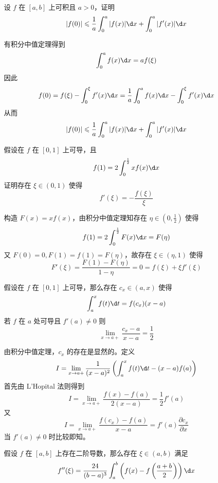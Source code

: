 \begin{problem}[000046]
设 $f$ 在 $[a, b]$ 上可积且 $a > 0$，证明
\[ |f(0)| \leqslant \frac{1}{a} \int_{0}^{a} |f(x)| \d x + \int_{0}^{a} |f'(x)| \d x \]
\end{problem}

\begin{solution}
	有积分中值定理得到
	\[ \int_{0}^{a} f(x) \d x = a f(\xi) \]
	因此
	\[ f(0) = f(\xi) - \int_{0}^{\xi} f'(x) \d x = \frac{1}{a} \int_{0}^{a} f(x) \d x - \int_{0}^{\xi} f'(x) \d x \]
	从而
	\[ |f(0)| \leqslant \frac{1}{a} \int_{0}^{a} |f(x)| \d x + \int_{0}^{a} |f'(x)| \d x \]
\end{solution}

\begin{problem}[000047]
假设在 $f$ 在 $[0, 1]$ 上可导，且
\[ f(1) = 2 \int_{0}^{\frac{1}{2}} x f(x) \d x \]
证明存在 $\xi \in (0, 1)$ 使得
\[ f'(\xi) = -\frac{f(\xi)}{\xi} \]
\end{problem}

\begin{solution}
	构造 $F(x) = x f(x)$，由积分中值定理知存在 $\eta \in (0, \frac{1}{2})$ 使得
	\[ f(1) = 2\int_{0}^{\frac{1}{2}} F(x) \d x = F(\eta) \]
	又 $F(0) = 0, F(1) = f(1) = F(\eta)$，故存在 $\xi \in (\eta, 1)$ 使得
	\[ F'(\xi) = \frac{F(1) - F(\eta)}{1 - \eta} = 0 = f(\xi) + \xi f'(\xi) \]
\end{solution}

\begin{problem}[000048]
假设在 $f$ 在 $[0, 1]$ 上可导，那么存在 $c_x \in (a, x)$ 使得
\[ \int_{a}^{x} f(t) \d t = f(c_x) (x - a) \]
若 $f$ 在 $a$ 处可导且 $f'(a) \neq 0$ 则
\[ \lim_{x \to a+} \frac{c_x - a}{x -a} = \frac{1}{2} \]
\end{problem}

\begin{solution}
	由积分中值定理，$c_x$ 的存在是显然的。定义
	\[ I = \lim_{x \to a+} \frac{1}{(x-a)^2} \left( \int_{a}^{x} f(t) \d t - (x - a) f(a) \right) \]
	首先由 L'Hopital 法则得到
	\[ I = \lim_{x \to a+} \frac{f(x) - f(a)}{2(x - a)} = \frac{1}{2} f'(a) \]
	又
	\[ I = \lim_{x \to a+}\frac{f(c_x) - f(a)}{x - a} = f'(a) \frac{\partial c_x}{\partial x} \]
	当 $f'(a) \neq 0$ 时比较即知。
\end{solution}

\begin{problem}[000049]
假设 $f$ 在 $[a, b]$ 上存在二阶导数，那么存在 $\xi \in (a, b)$ 满足
\[ f''(\xi) = \frac{24}{(b-a)^3} \int_{a}^{b} \left(f(x) - f\left(\frac{a+b}{2}\right)\right) \d x \]
\end{problem}

